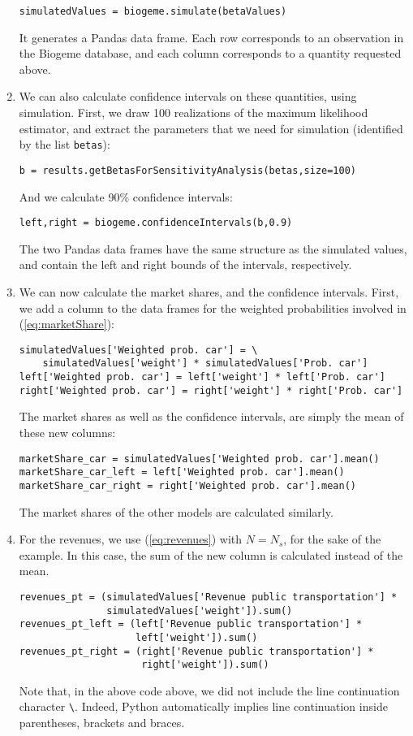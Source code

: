 \documentclass[12pt,a4paper]{article}
\newcommand{\req}[1]{(\ref{#1})}
\begin{document}
\begin{enumerate}
\begin{lstlisting}
simulatedValues = biogeme.simulate(betaValues)
\end{lstlisting}
It generates a Pandas data frame. Each row corresponds to an observation
in the Biogeme database, and each column corresponds to a quantity
requested above.
\item We can also calculate confidence intervals on these
  quantities, using simulation. First, we draw 100 realizations of the
  maximum likelihood estimator, and extract the parameters that we
  need for simulation (identified by the list \lstinline+betas+):
\begin{lstlisting}
b = results.getBetasForSensitivityAnalysis(betas,size=100)
\end{lstlisting}
And we calculate 90\% confidence intervals:
\begin{lstlisting}
left,right = biogeme.confidenceIntervals(b,0.9)
\end{lstlisting}
The two Pandas data frames have the same structure as the simulated
values, and contain the left and right bounds of the intervals,
respectively.
\item We can now calculate the market shares, and the confidence
  intervals. First, we add a column to the data frames for the
  weighted probabilities
  involved in \req{eq:marketShare}:
\begin{lstlisting}
simulatedValues['Weighted prob. car'] = \
    simulatedValues['weight'] * simulatedValues['Prob. car']
left['Weighted prob. car'] = left['weight'] * left['Prob. car']
right['Weighted prob. car'] = right['weight'] * right['Prob. car']
\end{lstlisting}
 The market shares as well as the confidence intervals,  are simply
 the mean of these new columns:
\begin{lstlisting}
marketShare_car = simulatedValues['Weighted prob. car'].mean()
marketShare_car_left = left['Weighted prob. car'].mean()
marketShare_car_right = right['Weighted prob. car'].mean()
\end{lstlisting}
The market shares of the other models are calculated similarly.
\item For the revenues, we use \req{eq:revenues} with $N=N_s$, for the
  sake of the example. In this case, the sum of the new column is calculated instead of the mean.
\begin{lstlisting}
revenues_pt = (simulatedValues['Revenue public transportation'] *
               simulatedValues['weight']).sum()
revenues_pt_left = (left['Revenue public transportation'] *
                    left['weight']).sum()
revenues_pt_right = (right['Revenue public transportation'] *
                     right['weight']).sum()
\end{lstlisting}
Note that, in the above code above, we did not include the line continuation
character \lstinline+\+. Indeed, Python automatically implies line continuation
inside parentheses, brackets and braces.
  \end{enumerate}
\end{document}
